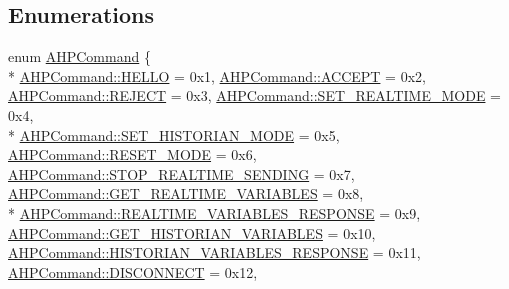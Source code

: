 \subsection*{Enumerations}
\begin{DoxyCompactItemize}
\item 
enum \hyperlink{namespace_a_h_p_ac6dabdee20c9d5b492f2578a36e04f51}{A\+H\+P\+Command} \{ \\*
\hyperlink{namespace_a_h_p_ac6dabdee20c9d5b492f2578a36e04f51aeb61eead90e3b899c6bcbe27ac581660}{A\+H\+P\+Command\+::\+H\+E\+L\+L\+O} = 0x1, 
\hyperlink{namespace_a_h_p_ac6dabdee20c9d5b492f2578a36e04f51a1fd72e016e8fbf2cf1f0c918dcd9bad3}{A\+H\+P\+Command\+::\+A\+C\+C\+E\+P\+T} = 0x2, 
\hyperlink{namespace_a_h_p_ac6dabdee20c9d5b492f2578a36e04f51a59b228d9fec9b88833bfe5d812ed8ad4}{A\+H\+P\+Command\+::\+R\+E\+J\+E\+C\+T} = 0x3, 
\hyperlink{namespace_a_h_p_ac6dabdee20c9d5b492f2578a36e04f51a420dd7ad8cafb0c22240179d7e68f3d1}{A\+H\+P\+Command\+::\+S\+E\+T\+\_\+\+R\+E\+A\+L\+T\+I\+M\+E\+\_\+\+M\+O\+D\+E} = 0x4, 
\\*
\hyperlink{namespace_a_h_p_ac6dabdee20c9d5b492f2578a36e04f51adf28ec5a1dc2b0d13d543e2f044d0506}{A\+H\+P\+Command\+::\+S\+E\+T\+\_\+\+H\+I\+S\+T\+O\+R\+I\+A\+N\+\_\+\+M\+O\+D\+E} = 0x5, 
\hyperlink{namespace_a_h_p_ac6dabdee20c9d5b492f2578a36e04f51aba12d2493fc3be7067212035e03a7c04}{A\+H\+P\+Command\+::\+R\+E\+S\+E\+T\+\_\+\+M\+O\+D\+E} = 0x6, 
\hyperlink{namespace_a_h_p_ac6dabdee20c9d5b492f2578a36e04f51a675775735b8a9632b54b03e4626b4e5f}{A\+H\+P\+Command\+::\+S\+T\+O\+P\+\_\+\+R\+E\+A\+L\+T\+I\+M\+E\+\_\+\+S\+E\+N\+D\+I\+N\+G} = 0x7, 
\hyperlink{namespace_a_h_p_ac6dabdee20c9d5b492f2578a36e04f51a1e4ee4b133870efb01306aaae1b393f2}{A\+H\+P\+Command\+::\+G\+E\+T\+\_\+\+R\+E\+A\+L\+T\+I\+M\+E\+\_\+\+V\+A\+R\+I\+A\+B\+L\+E\+S} = 0x8, 
\\*
\hyperlink{namespace_a_h_p_ac6dabdee20c9d5b492f2578a36e04f51a91e5b9272b17998cfe6a515259a688e6}{A\+H\+P\+Command\+::\+R\+E\+A\+L\+T\+I\+M\+E\+\_\+\+V\+A\+R\+I\+A\+B\+L\+E\+S\+\_\+\+R\+E\+S\+P\+O\+N\+S\+E} = 0x9, 
\hyperlink{namespace_a_h_p_ac6dabdee20c9d5b492f2578a36e04f51a2352e7dd678c2aca75c2a0e31b065fe0}{A\+H\+P\+Command\+::\+G\+E\+T\+\_\+\+H\+I\+S\+T\+O\+R\+I\+A\+N\+\_\+\+V\+A\+R\+I\+A\+B\+L\+E\+S} = 0x10, 
\hyperlink{namespace_a_h_p_ac6dabdee20c9d5b492f2578a36e04f51ae4b44e970abe206dd9eba609a779a416}{A\+H\+P\+Command\+::\+H\+I\+S\+T\+O\+R\+I\+A\+N\+\_\+\+V\+A\+R\+I\+A\+B\+L\+E\+S\+\_\+\+R\+E\+S\+P\+O\+N\+S\+E} = 0x11, 
\hyperlink{namespace_a_h_p_ac6dabdee20c9d5b492f2578a36e04f51add7cd0eb57db08d4f98abc48e5593462}{A\+H\+P\+Command\+::\+D\+I\+S\+C\+O\+N\+N\+E\+C\+T} = 0x12, 

\end{DoxyCompactItemize}
